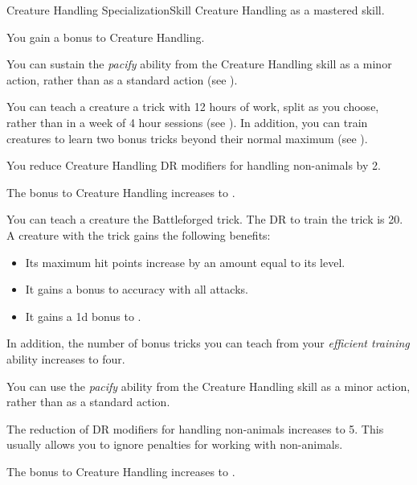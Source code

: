     \begin{feat}{Creature Handling Specialization}{Skill}
        \featpre Creature Handling as a mastered skill.

         You gain a  bonus to Creature Handling.

         You can sustain the \textit{pacify} ability from the Creature Handling skill as a minor action, rather than as a standard action (see ).

         You can teach a creature a trick with 12 hours of work, split as you choose, rather than in a week of 4 hour sessions (see ).
        In addition, you can train creatures to learn two bonus tricks beyond their normal maximum (see ).

         You reduce Creature Handling DR modifiers for handling non-animals by 2.

         The bonus to Creature Handling increases to .

         You can teach a creature the Battleforged trick.
        The DR to train the trick is 20.
        A creature with the trick gains the following benefits:
        \begin{itemize}
            \item Its maximum hit points increase by an amount equal to its level.
            \item It gains a  bonus to accuracy with all attacks.
            \item It gains a \plus1d bonus to .
        \end{itemize}
        In addition, the number of bonus tricks you can teach from your \textit{efficient training} ability increases to four.

         You can use the \textit{pacify} ability from the Creature Handling skill as a minor action, rather than as a standard action.

         The reduction of DR modifiers for handling non-animals increases to 5.
        This usually allows you to ignore penalties for working with non-animals.

         The bonus to Creature Handling increases to .


\end{feat}
